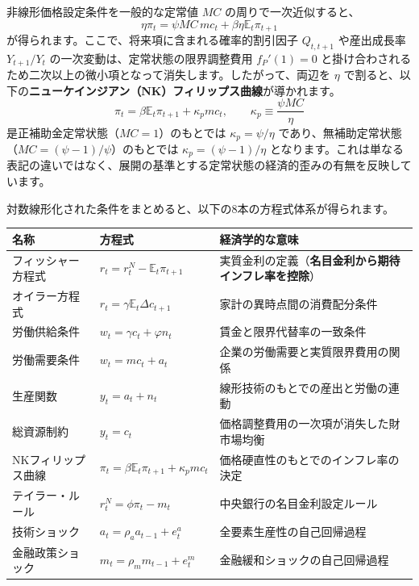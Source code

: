 \documentclass[
  japanese,
  lualatex,
  ja=standard,
  12pt,
  a4paper]{ltjsarticle}
\newcounter{none} %
\begin{document}
非線形価格設定条件を一般的な定常値 \(MC\) の周りで一次近似すると、 \[
\eta\pi_t
=\psi MC\,mc_t
+\beta\eta\mathbb{E}_t\pi_{t+1}
\] が得られます。ここで、将来項に含まれる確率的割引因子 \(Q_{t,t+1}\)
や産出成長率 \(Y_{t+1}/Y_t\) の一次変動は、定常状態の限界調整費用
\(f_P'(1)=0\)
と掛け合わされるため二次以上の微小項となって消失します。したがって、両辺を
\(\eta\)
で割ると、以下の\textbf{ニューケインジアン（NK）フィリップス曲線}が導かれます。
\[
\pi_t
=\beta\mathbb{E}_t\pi_{t+1}
+\kappa_pmc_t,
\qquad
\kappa_p\equiv\frac{\psi MC}{\eta}
\] 是正補助金定常状態（\(MC=1\)）のもとでは \(\kappa_p=\psi/\eta\)
であり、無補助定常状態（\(MC=(\psi-1)/\psi\)）のもとでは
\(\kappa_p=(\psi-1)/\eta\)
となります。これは単なる表記の違いではなく、展開の基準とする定常状態の経済的歪みの有無を反映しています。

対数線形化された条件をまとめると、以下の8本の方程式体系が得られます。

{\def\LTcaptype{none} %
\begin{longtable}[]{@{}
  >{\raggedright\arraybackslash}p{}
  >{\raggedright\arraybackslash}p{}
  >{\raggedright\arraybackslash}p{}@{}}
\toprule\noalign{}
\begin{minipage}[b]{\linewidth}\raggedright
名称
\end{minipage} & \begin{minipage}[b]{\linewidth}\raggedright
方程式
\end{minipage} & \begin{minipage}[b]{\linewidth}\raggedright
経済学的な意味
\end{minipage} \\
\midrule\noalign{}
\endhead
\bottomrule\noalign{}
\endlastfoot
フィッシャー方程式 & \(r_t=r_t^N-\mathbb{E}_t\pi_{t+1}\) &
実質金利の定義（\textbf{名目金利から期待インフレ率を控除}） \\
オイラー方程式 & \(r_t=\gamma\mathbb{E}_t\Delta c_{t+1}\) &
家計の異時点間の消費配分条件 \\
労働供給条件 & \(w_t=\gamma c_t+\varphi n_t\) &
賃金と限界代替率の一致条件 \\
労働需要条件 & \(w_t=mc_t+a_t\) & 企業の労働需要と実質限界費用の関係 \\
生産関数 & \(y_t=a_t+n_t\) & 線形技術のもとでの産出と労働の連動 \\
総資源制約 & \(y_t=c_t\) & 価格調整費用の一次項が消失した財市場均衡 \\
NKフィリップス曲線 & \(\pi_t=\beta\mathbb{E}_t\pi_{t+1}+\kappa_p mc_t\)
& 価格硬直性のもとでのインフレ率の決定 \\
テイラー・ルール & \(r_t^N=\phi\pi_t-m_t\) &
中央銀行の名目金利設定ルール \\
技術ショック & \(a_t=\rho_a a_{t-1}+e_t^a\) &
全要素生産性の自己回帰過程 \\
金融政策ショック & \(m_t=\rho_m m_{t-1}+e_t^m\) &
金融緩和ショックの自己回帰過程 \\
\end{longtable}
}
\end{document}
